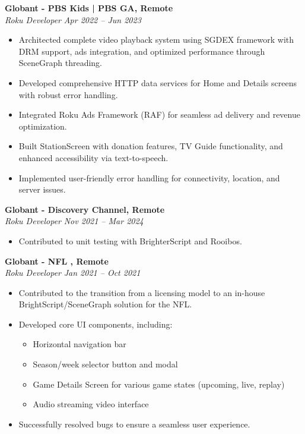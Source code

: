 \documentclass[11pt,a4paper]{article}
\newlength{\jobspacing}
\begin{document}
\vspace{\jobspacing}

\textbf{Globant - PBS Kids | PBS GA, Remote} \\
\emph{Roku Developer} \hfill \textit{Apr 2022 -- Jun 2023} \\
\begin{itemize}[leftmargin=*]
    \item Architected complete video playback system using SGDEX framework with DRM support, ads integration, and optimized performance through SceneGraph threading.
    \item Developed comprehensive HTTP data services for Home and Details screens with robust error handling.
    \item Integrated Roku Ads Framework (RAF) for seamless ad delivery and revenue optimization.
    \item Built StationScreen with donation features, TV Guide functionality, and enhanced accessibility via text-to-speech.
    \item Implemented user-friendly error handling for connectivity, location, and server issues.
\end{itemize}

\vspace{\jobspacing}

\textbf{Globant - Discovery Channel, Remote} \\
\emph{Roku Developer} \hfill \textit{Nov 2021 -- Mar 2024} \\
\begin{itemize}[leftmargin=*]
    \item Contributed to unit testing with BrighterScript and Rooibos.
\end{itemize}

\vspace{\jobspacing}

\textbf{Globant - NFL , Remote} \\
\emph{Roku Developer} \hfill \textit{Jan 2021 -- Oct 2021} \\
\begin{itemize}[leftmargin=*]
    \item Contributed to the transition from a licensing model to an in-house BrightScript/SceneGraph solution for the NFL.
    \item Developed core UI components, including:
    \begin{itemize}[leftmargin=*]
        \item Horizontal navigation bar
        \item Season/week selector button and modal
        \item Game Details Screen for various game states (upcoming, live, replay)
        \item Audio streaming video interface
    \end{itemize}
    \item Successfully resolved bugs to ensure a seamless user experience.
\end{itemize}
\end{document}
